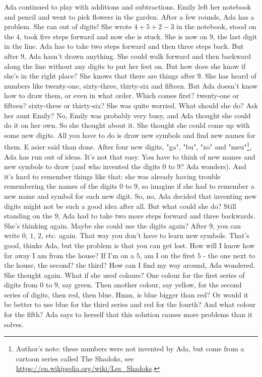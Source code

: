 Ada continued to play with additions and subtractions. 
Emily left her notebook and pencil and went to pick flowers in the garden. 
After a few rounds, Ada has a problem. 
She ran out of digits! 
She wrote $4 + 5 + 2 - 3$ in the notebook, stood on the $4$, took five steps forward and now she is stuck. 
She is now on $9$, the last digit in the line. 
Ada has to take two steps forward and then three steps back.
But after $9$, Ada hasn't drawn anything.
She could walk forward and then backward along the line without any digits to put her feet on. But how does she know if she's in the right place? 
She knows that there are things after $9$. 
She has heard of numbers like twenty-one, sixty-three, thirty-six and fifteen. 
But Ada doesn't know how to draw them, or even in what order.
Which comes first? twenty-one or fifteen? sixty-three or thirty-six?
She was quite worried. What should she do? Ask her aunt Emily? No, Emily was probably very busy, and Ada thought she could do it on her own. So she thought about it. She thought she could come up with some new digits. 
All you have to do is draw new symbols and find new names for them. E
asier said than done. After four new digits, "ga", "bu", "zo" and "meu"\footnote{Author's note: these numbers were not invented by Ada, but come from a cartoon series called The Shadoks, see \url{https://en.wikipedia.org/wiki/Les_Shadoks}.}, Ada has run out of ideas.
It's not that easy. You have to think of new names and new symbols to draw (and who invented the digits $0$ to $9$? Ada wonders). 
And it's hard to remember things like that: she was already having trouble remembering the names of the digits $0$ to $9$, so imagine if she had to remember a new name and symbol for each new digit. 
So, no, Ada decided that inventing new digits might not be such a good idea after all. But what could she do? 
Still standing on the $9$, Ada had to take two more steps forward and three backwards. 
She's thinking again. Maybe she could use the digits again? 
After $9$, you can write $0$, $1$, $2$, etc. again. That way you don't have to learn new symbols. That's good, thinks Ada, but the problem is that you can get lost.
How will I know how far away I am from the house? If I'm on a $5$, am I on the first $5$ - the one next to the house, the second? the third? How can I find my way around, Ada wondered.
She thought again. What if she used colours? 
One colour for the first series of digits from $0$ to $9$, say green. Then another colour, say yellow, for the second series of digits, then red, then blue. Hmm, is blue bigger than red? Or would it be better to use blue for the third series and red for the fourth? And what colour for the fifth? Ada says to herself that this solution causes more problems than it solves.  
